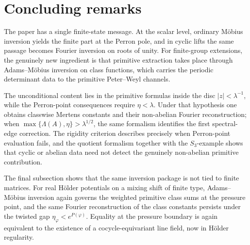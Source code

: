 \section{Concluding remarks}\label{sec:conclusion}

The paper has a single finite-state message. At the scalar level,
ordinary M\"obius inversion yields the finite part at the Perron pole,
and in cyclic lifts the same passage becomes Fourier inversion on roots
of unity. For finite-group extensions, the genuinely new ingredient is
that primitive extraction takes place through Adams--M\"obius inversion
on class functions, which carries the periodic determinant data to the
primitive Peter--Weyl channels.

The unconditional content lies in the primitive formulas inside the disc
\(|z|<\lambda^{-1}\), while the Perron-point consequences require
\(\eta<\lambda\). Under that hypothesis one obtains classwise Mertens
constants and their non-abelian Fourier reconstruction; when
\(\max\{\Lambda(A),\eta\}>\lambda^{1/2}\), the same formalism identifies
the first spectral-edge correction. The rigidity criterion describes
precisely when Perron-point evaluation fails, and the quotient
formalism together with the \(S_3\)-example shows that cyclic or
abelian data need not detect the genuinely non-abelian primitive
contribution.

The final subsection shows that the same inversion package is not tied
to finite matrices. For real H\"older potentials on a mixing shift of
finite type, Adams--M\"obius inversion again governs the weighted
primitive class sums at the pressure point, and the same Fourier
reconstruction of the class constants persists under the twisted gap
\(\eta_\varphi<e^{P(\varphi)}\). Equality at the pressure boundary is
again equivalent to the existence of a cocycle-equivariant line field,
now in H\"older regularity.
